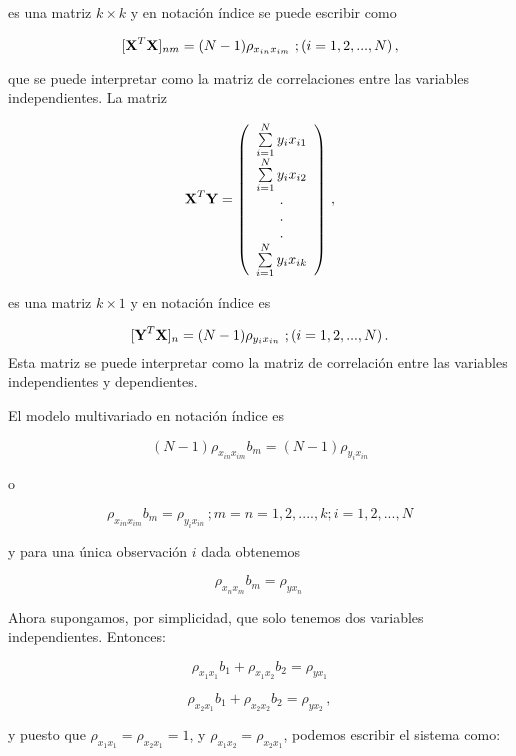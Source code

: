\documentclass[
]{agujournal2019}
\begin{document}
es una matriz \(k\times k\) y en notación índice se puede escribir como

\[[{\textbf X}^T{\textbf X}]_{nm}=(N-1)\rho_{x_{in} x_{im}}\,\,;(i=1,2,...,N)\,,\]

que se puede interpretar como la matriz de correlaciones entre las
variables independientes. La matriz

\[{\textbf X}^T{\textbf Y}=\left(\begin{array}{c}
  \sum\limits_{i=1}^N y_i x_{i1}\\
  \sum\limits_{i=1}^N y_i x_{i2}\\
                   . \\
           . \\
           . \\
  \sum\limits_{i=1}^N y_i x_{ik}\\
        \end{array}\right)\,,\]

es una matriz \(k\times 1\) y en notación índice es

\[[{\textbf Y}^T{\textbf X}]_n=(N-1)\rho_{y_i x_{in}}\,\,;(i=1,2,...,N)\,.\]
Esta matriz se puede interpretar como la matriz de correlación entre las
variables independientes y dependientes. ~

El modelo multivariado en notación índice es

\[(N-1)\rho_{x_{in} x_{im}}b_m=(N-1)\rho_{y_i x_{in}}\]

o

\[\rho_{x_{in} x_{im}}b_m=\rho_{y_i x_{in}}\,;m=n=1,2,....,k; i=1,2,...,N\]

y para una única observación \(i\) dada obtenemos

\[\rho_{x_{n} x_{m}}b_m=\rho_{y x_{n}}\,\]

Ahora supongamos, por simplicidad, que solo tenemos dos variables
independientes. Entonces:

\[\rho_{x_{1} x_{1}}b_1+\rho_{x_{1} x_{2}}b_2=\rho_{y x_{1}}\]

\[\rho_{x_{2} x_{1}}b_1+\rho_{x_{2} x_{2}}b_2=\rho_{y x_{2}}\,,\]

y puesto que \(\rho_{x_{1} x_{1}}=\rho_{x_{2} x_{1}}=1\), y
\(\rho_{x_{1} x_{2}}=\rho_{x_{2} x_{1}}\), podemos escribir el sistema
como:
\end{document}

